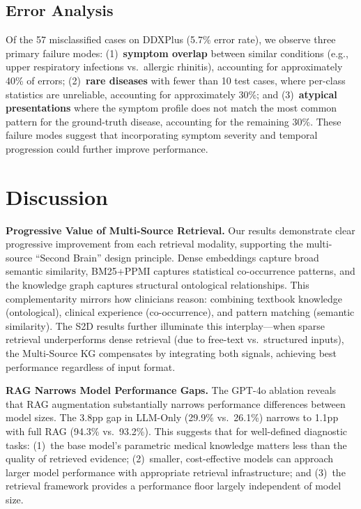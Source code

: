 \documentclass[runningheads]{llncs}
\begin{document}
\subsection{Error Analysis}
\label{sec:error_analysis}

Of the 57 misclassified cases on DDXPlus (5.7\% error rate), we observe three primary failure modes: (1)~\textbf{symptom overlap} between similar conditions (e.g., upper respiratory infections vs.\ allergic rhinitis), accounting for approximately 40\% of errors; (2)~\textbf{rare diseases} with fewer than 10 test cases, where per-class statistics are unreliable, accounting for approximately 30\%; and (3)~\textbf{atypical presentations} where the symptom profile does not match the most common pattern for the ground-truth disease, accounting for the remaining 30\%. These failure modes suggest that incorporating symptom severity and temporal progression could further improve performance.

\section{Discussion}
\label{sec:discussion}

\textbf{Progressive Value of Multi-Source Retrieval.}
Our results demonstrate clear progressive improvement from each retrieval modality, supporting the multi-source ``Second Brain'' design principle. Dense embeddings capture broad semantic similarity, BM25+PPMI captures statistical co-occurrence patterns, and the knowledge graph captures structural ontological relationships. This complementarity mirrors how clinicians reason: combining textbook knowledge (ontological), clinical experience (co-occurrence), and pattern matching (semantic similarity). The S2D results further illuminate this interplay---when sparse retrieval underperforms dense retrieval (due to free-text vs.\ structured inputs), the Multi-Source KG compensates by integrating both signals, achieving best performance regardless of input format.

\textbf{RAG Narrows Model Performance Gaps.}
The GPT-4o ablation reveals that RAG augmentation substantially narrows performance differences between model sizes. The 3.8pp gap in LLM-Only (29.9\% vs.\ 26.1\%) narrows to 1.1pp with full RAG (94.3\% vs.\ 93.2\%). This suggests that for well-defined diagnostic tasks: (1)~the base model's parametric medical knowledge matters less than the quality of retrieved evidence; (2)~smaller, cost-effective models can approach larger model performance with appropriate retrieval infrastructure; and (3)~the retrieval framework provides a performance floor largely independent of model size.
\end{document}
